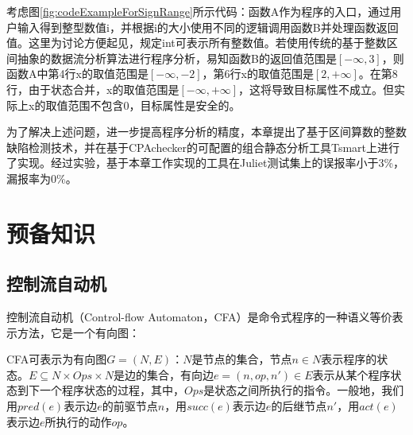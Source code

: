 考虑图\ref{fig:codeExampleForSignRange}所示代码：函数A作为程序的入口，通过用户输入得到整型数值i，并根据i的大小使用不同的逻辑调用函数B并处理函数返回值。这里为讨论方便起见，规定int可表示所有整数值。若使用传统的基于整数区间抽象的数据流分析算法进行程序分析，易知函数B的返回值范围是$ [-\infty, 3] $，则函数A中第4行x的取值范围是$ [-\infty, -2] $，第6行x的取值范围是$ [2, +\infty] $。在第8行，由于状态合并，x的取值范围是$ [-\infty, +\infty] $，这将导致目标属性不成立。但实际上x的取值范围不包含0，目标属性是安全的。

为了解决上述问题，进一步提高程序分析的精度，本章提出了基于区间算数的整数缺陷检测技术，并在基于CPAchecker\cite{beyer2007configurable}的可配置的组合静态分析工具Tsmart上进行了实现。经过实验，基于本章工作实现的工具在Juliet测试集上的误报率小于3\%，漏报率为0\%。

\section{预备知识}
\label{sec:区间算数预备知识}

%

\subsection{控制流自动机}
\label{sec:控制流自动机}

控制流自动机（Control-flow Automaton，CFA）是命令式程序的一种语义等价表示方法，它是一个有向图：
\begin{definition}
	CFA可表示为有向图$ G = (N, E) $：$ N $是节点的集合，节点$ n \in N $表示程序的状态。$ E \subseteq N \times Ops \times N $是边的集合，有向边$ e = (n, op, n') \in E $表示从某个程序状态到下一个程序状态的过程，其中，$ Ops $是状态之间所执行的指令。一般地，我们用$ pred(e) $表示边$ e $的前驱节点$ n $，用$ succ(e) $表示边$ e $的后继节点$ n' $，用$ act(e) $表示边$ e $所执行的动作$ op $。
\end{definition}

